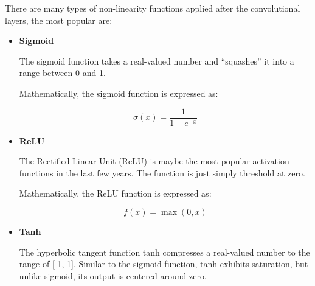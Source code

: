There are many types of non-linearity functions applied after the convolutional
layers, the most popular are: \\

\begin{itemize}

  \item \textbf{Sigmoid}

    The sigmoid function takes a real-valued number and “squashes” it into a
    range between 0 and 1.


    \raggedright
    Mathematically, the sigmoid function is expressed as:

    \[ \sigma(x) = \frac{1}{1 + e^{-x}} \]

    \newpage

  \item \textbf{ReLU}

    The Rectified Linear Unit (ReLU) is maybe the most popular activation
    functions in the last few years. The function is just simply threshold at
    zero.

    \centering {}

    \raggedright
    Mathematically, the ReLU function is expressed as:

    \[f(x) = \max(0, x)\]

  \item \textbf{Tanh}

    The hyperbolic tangent function tanh compresses a real-valued number to
    the range of [-1, 1]. Similar to the sigmoid function, tanh exhibits
    saturation, but unlike sigmoid, its output is centered around zero.


\end{itemize}
